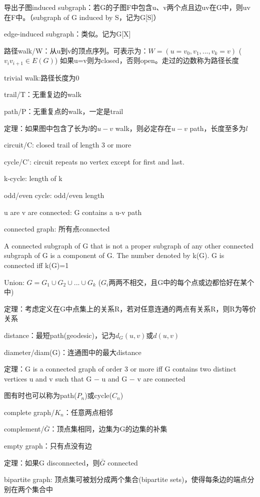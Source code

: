 \documentclass[cn,hazy,blue,screen,14pt]{note}
\begin{document}
导出子图induced subgraph：若G的子图F中包含u、v两个点且边uv在G中，则uv在F中。（subgraph of G induced by S，记为G[S]）

edge-induced subgraph：类似。记为G[X]

路径walk/W：从u到v的顶点序列。可表示为：$W=(u=v_{0},v_{1},...,v_{k}=v)$ ($v_{i}v_{i+1}\in E(G)$)
如果u=v则为closed，否则open。走过的边数称为路径长度

trivial walk:路径长度为0

trail/T：无重复边的walk

path/P：无重复点的walk，一定是trail

定理：如果图中包含了长为$l$的$u-v$ walk，则必定存在$u-v$ path，长度至多为$l$

circuit/C: closed trail of length 3 or more

cycle/C': circuit repeats no vertex except for first and last. 

k-cycle: length of k

odd/even cycle: odd/even length

u are v are connected: G contains a u-v path

connected graph: 所有点connected

A connected subgraph of G that is not a
proper subgraph of any other connected subgraph of G is a component of G. The number denoted by k(G). G is connected iff k(G)=1

Union: $G=G_{1}\cup G_{2}\cup ... \cup G_{k}$ ($G_{i}$两两不相交，且G中的每个点或边都恰好在某个中)

定理：考虑定义在G中点集上的关系R，若对任意连通的两点有关系R，则R为等价关系

distance：最短path(geodesic)，记为$d_{G}(u,v)$或$d(u,v)$

diameter/diam(G)：连通图中的最大distance

定理：G is a connected graph of order 3 or more iff G contains two distinct vertices
u and v such that G − u and G − v are connected

图有时也可以称为path($P_{n}$)或cycle($C_{n}$)

complete graph/$K_{n}$：任意两点相邻

complement/$\bar{G}$：顶点集相同，边集为G的边集的补集

empty graph：只有点没有边

定理：如果G disconnected，则$\bar{G}$ connected

bipartite graph: 顶点集可被划分成两个集合(bipartite sets)，使得每条边的端点分别在两个集合中
\end{document}
